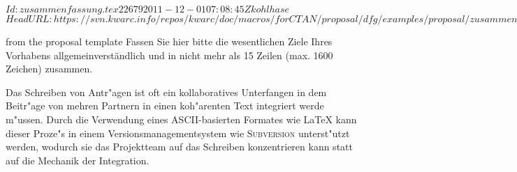 \svnInfo $Id: zusammenfassung.tex 22679 2011-12-01 07:08:45Z kohlhase $
\svnKeyword $HeadURL: https://svn.kwarc.info/repos/kwarc/doc/macros/forCTAN/proposal/dfg/examples/proposal/zusammenfassung.tex $
\begin{Abriss}
\begin{todo}{from the proposal template}
  Fassen Sie hier bitte die wesentlichen Ziele Ihres Vorhabens allgemeinverständlich und
  in nicht mehr als 15 Zeilen (max. 1600 Zeichen) zusammen.
\end{todo}
Das Schreiben von Antr"agen ist oft ein kollaboratives Unterfangen in dem Beitr"age von
mehren Partnern in einen koh"arenten Text integriert werde m"ussen. Durch die Verwendung
eines ASCII-basierten Formates wie {\LaTeX} kann dieser Proze"s in einem
Versionsmanagementsystem wie {\textsc{Subversion}} unterst"utzt werden, wodurch sie das
Projektteam auf das Schreiben konzentrieren kann statt auf die Mechanik der Integration.
\end{Abriss}

